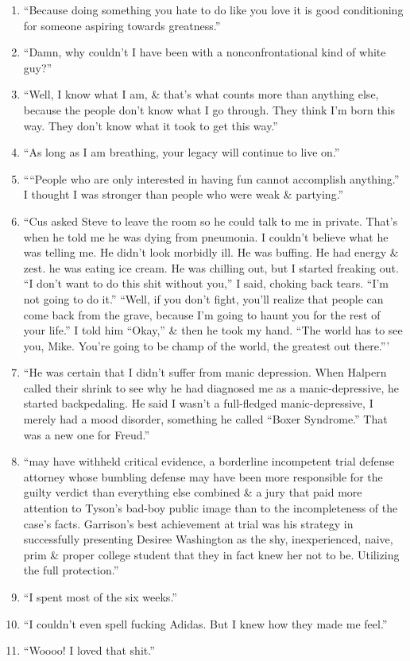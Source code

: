 \documentclass{article}
\numberwithin{equation}{section}
\begin{document}
\begin{enumerate}
	\item ``Because doing something you hate to do like you love it is good conditioning for someone aspiring towards greatness.''
	\item ``Damn, why couldn't I have been with a nonconfrontational kind of white guy?''
	\item ``Well, I know what I am, \& that's what counts more than anything else, because the people don't know what I go through. They think I'm born this way. They don't know what it took to get this way.''
	\item ``As long as I am breathing, your legacy will continue to live on.''
	\item ````People who are only interested in having fun cannot accomplish anything.'' I thought I was stronger than people who were weak \& partying.''
	\item ``Cus asked Steve to leave the room so he could talk to me in private. That's when he told me he was dying from pneumonia. I couldn't believe what he was telling me. He didn't look morbidly ill. He was buffing. He had energy \& zest. he was eating ice cream. He was chilling out, but I started freaking out. ``I don't want to do this shit without you,'' I said, choking back tears. ``I'm not going to do it.'' ``Well, if you don't fight, you'll realize that people can come back from the grave, because I'm going to haunt you for the rest of your life.'' I told him ``Okay,'' \& then he took my hand. ``The world has to see you, Mike. You're going to be champ of the world, the greatest out there.'''
	\item ``He was certain that I didn't suffer from manic depression. When Halpern called their shrink to see why he had diagnosed me as a manic-depressive, he started backpedaling. He said I wasn't a full-fledged manic-depressive, I merely had a mood disorder, something he called ``Boxer Syndrome.'' That was a new one for Freud.''
	\item ``may have withheld critical evidence, a borderline incompetent trial defense attorney whose bumbling defense may have been more responsible for the guilty verdict than everything else combined \& a jury that paid more attention to Tyson's bad-boy public image than to the incompleteness of the case's facts. Garrison's best achievement at trial was his strategy in successfully presenting Desiree Washington as the shy, inexperienced, naive, prim \& proper college student that they in fact knew her not to be. Utilizing the full protection.''
	\item ``I spent most of the six weeks.''
	\item ``I couldn't even spell fucking Adidas. But I knew how they made me feel.''
	\item ``Woooo! I loved that shit.''
\end{enumerate}


\printbibliography[heading=bibintoc]
	
\end{document}
